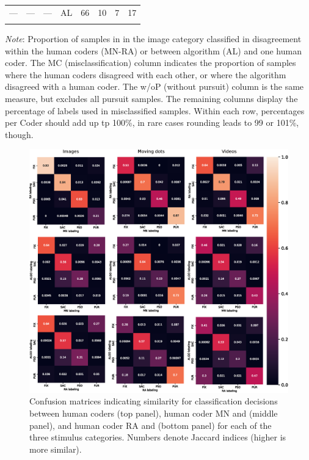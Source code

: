 \begin{table}[h!]
\begin{tabular}{llllllll}
		---& ---& ---& AL & 66 & 10 & 7 & 17 \\
		\noalign{\smallskip}\hline
	\end{tabular}
\textit{Note}: Proportion of samples in in the image category classified in disagreement within the human coders (MN-RA) or between \remodnav algorithm (AL) and one human coder. The MC (misclassification) column indicates the proportion of samples where the human coders disagreed with each other, or where the algorithm disagreed with a human coder. The w/oP (without pursuit) column is the same measure, but excludes all pursuit samples. The remaining columns display the percentage of labels used in misclassified samples. Within each row, percentages per Coder should add up tp 100\%, in rare cases rounding leads to 99 or 101\%, though.
\end{table}


\begin{figure}
	\includegraphics[width=1\textwidth]{img/conf_drawing.eps}
	\caption{Confusion matrices indicating similarity for classification decisions between human coders (top panel), human coder MN and \remodnav (middle panel), and human coder RA and \remodnav (bottom panel) for each of the three stimulus categories. Numbers denote Jaccard indices (higher is more similar).}
	\label{fig:conf}       %
\end{figure}

